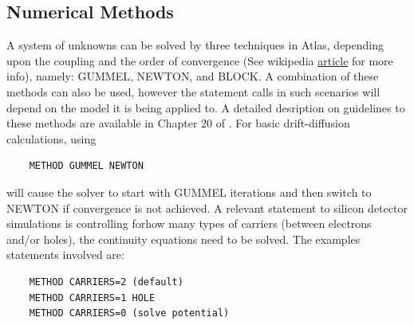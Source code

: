 \documentclass[11pt]{article}
\begin{document}
\subsection{Numerical Methods}
A system of unknowns can be solved by three techniques in Atlas, depending upon the coupling and the order of convergence (See wikipedia \href{https://en.wikipedia.org/wiki/Rate_of_convergence}{article} for more info), namely: GUMMEL, NEWTON, and BLOCK. A combination of these methods can also be used, however the statement calls in such scenarios will depend on the model it is being applied to. A detailed desription on guidelines to these methods are available in Chapter 20 of \cite{silvaco-atlas}. For basic drift-diffusion calculations, using
\begin{verbatim}
    METHOD GUMMEL NEWTON
\end{verbatim}
will cause the solver to start with GUMMEL iterations and then switch to NEWTON if convergence is not achieved.
\newline A relevant statement to silicon detector simulations is controlling forhow many types of carriers (between electrons and/or holes), the continuity equations need to be solved. The examples statements involved are:
\begin{verbatim}
    METHOD CARRIERS=2 (default)
    METHOD CARRIERS=1 HOLE
    METHOD CARRIERS=0 (solve potential)
\end{verbatim}


\end{document}
